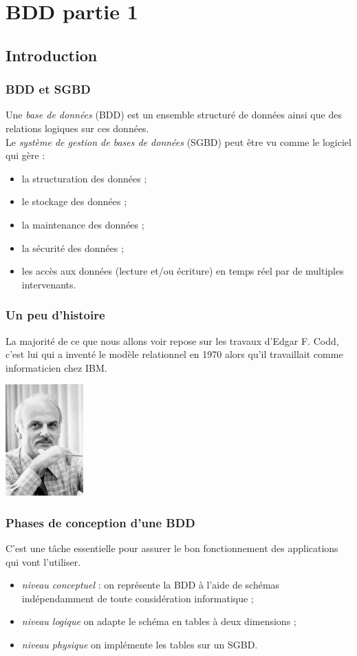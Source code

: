 \documentclass[10pt,cours,a4paper,firamath]{nsi}
\begin{document}
\chapter{BDD partie 1}
\section{Introduction}
\subsection{BDD et SGBD}
Une \textit{base de données} (BDD) est un ensemble structuré de données ainsi que des relations logiques sur ces données.\\

Le \textit{système de gestion de bases de données} (SGBD) peut être vu comme le logiciel qui gère :
\begin{itemize}
    \item	la structuration des données ;
    \item	le stockage des données ;
    \item 	la maintenance des données ;
    \item 	la sécurité des données ;
    \item 	les accès aux données (lecture et/ou écriture) en temps réel par de multiples intervenants.
\end{itemize}


\subsection{Un peu d'histoire}
La majorité de ce que nous allons voir repose sur les travaux d'Edgar F. Codd, c'est lui qui a inventé le modèle relationnel en 1970 alors qu'il travaillait comme informaticien chez IBM.
\begin{center}
    \includegraphics[width=3cm]{img/codd}
\end{center}


\subsection{Phases de conception d'une BDD}
C'est une tâche essentielle pour assurer le bon fonctionnement des applications qui vont l'utiliser.
\begin{itemize}
    \item	\textit{niveau conceptuel} : on représente la BDD à l'aide de schémas indépendamment de toute considération informatique ;
    \item	\textit{niveau logique} on adapte le schéma en tables à deux dimensions ;
    \item	\textit{niveau physique} on implémente les tables sur un SGBD.
\end{itemize}
\end{document}
